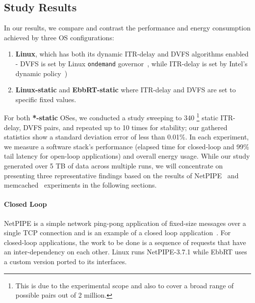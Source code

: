 \subsection{Study Results}
\label{sec:exp}
In our results, we compare and contrast the performance and energy consumption achieved by three OS configurations: 
 \begin{enumerate}
     \item \textbf{Linux}, which has both its dynamic ITR-delay and DVFS algorithms enabled - DVFS is set by Linux \texttt{ondemand} governor~\cite{cpufreq_governor}, while ITR-delay is set by Intel's dynamic policy~\cite{intelitr})
     \item \textbf{Linux-static} and \textbf{EbbRT-static} where ITR-delay and DVFS are set to specific fixed values.
 \end{enumerate}
For both \textbf{*-static} OSes, we conducted a study sweeping to 340 \footnote{This is due to the experimental scope and also to cover a broad range of possible pairs out of 2 million.} static ITR-delay, DVFS pairs, and repeated up to 10 times for stability; our gathered statistics show a standard deviation error of less than 0.01\%. In each experiment, we measure a software stack's performance (elapsed time for closed-loop and 99\% tail latency for open-loop applications) and overall energy usage. While our study generated over 5 TB of data across multiple runs, we will concentrate on presenting three representative findings based on the results of NetPIPE~\cite{snell1996netpipe} and memcached~\cite{memcached} experiments in the following sections.

\paragraph*{Closed Loop} 
NetPIPE is a simple network ping-pong application of fixed-size messages over a single TCP connection and is an example of a closed loop application~\cite{Barroso:2009:DCI:1643608, oldi-study, oldi-pegasus, warehouse-power, energyproportion, WebSearch}. For closed-loop applications, the work to be done is a sequence of requests that have an inter-dependency on each other. Linux runs NetPIPE-3.7.1 while EbbRT uses a custom version ported to its interfaces. 


